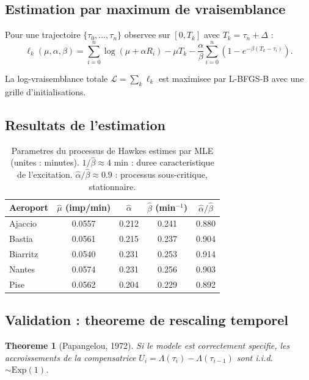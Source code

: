 \documentclass[a4paper,11pt]{article}
\newtheorem{theoreme}{Theoreme}[section]
\begin{document}
\subsection{Estimation par maximum de vraisemblance}

Pour une trajectoire $\{\tau_0, \ldots, \tau_n\}$ observee sur $[0, T_k]$
avec $T_k = \tau_n + \Delta$ :
\[
\ell_k(\mu, \alpha, \beta) =
\sum_{i=0}^{n} \log(\mu + \alpha R_i)
- \mu T_k - \frac{\alpha}{\beta}\sum_{i=0}^{n}\left(1 - e^{-\beta(T_k - \tau_i)}\right).
\]

La log-vraisemblance totale $\mathcal{L} = \sum_k \ell_k$ est maximisee par
L-BFGS-B avec une grille d'initialisations.

\subsection{Resultats de l'estimation}

\begin{table}[H]
\centering
\begin{tabular}{lcccc}
\toprule
Aeroport & $\hat\mu$ (imp/min) & $\hat\alpha$ & $\hat\beta$ (min$^{-1}$) &
$\hat\alpha/\hat\beta$ \\
\midrule
Ajaccio  & 0.0557 & 0.212 & 0.241 & 0.880 \\
Bastia   & 0.0561 & 0.215 & 0.237 & 0.904 \\
Biarritz & 0.0540 & 0.231 & 0.253 & 0.914 \\
Nantes   & 0.0574 & 0.231 & 0.256 & 0.903 \\
Pise     & 0.0562 & 0.204 & 0.229 & 0.892 \\
\bottomrule
\end{tabular}
\caption{Parametres du processus de Hawkes estimes par MLE (unites : minutes).
$1/\hat\beta \approx 4$ min : duree caracteristique de l'excitation.
$\hat\alpha/\hat\beta \approx 0.9$ : processus sous-critique, stationnaire.}
\end{table}

\subsection{Validation : theoreme de rescaling temporel}

\begin{theoreme}[Papangelou, 1972]
Si le modele est correctement specifie, les accroissements de la compensatrice
$U_i = \Lambda(\tau_i) - \Lambda(\tau_{i-1})$ sont i.i.d. $\sim \mathrm{Exp}(1)$.
\end{theoreme}
\end{document}
